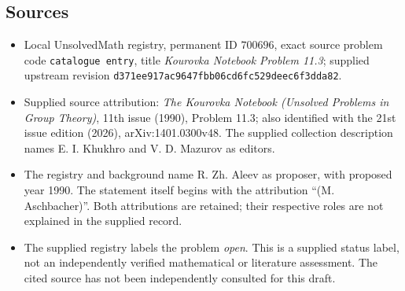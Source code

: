 \documentclass[11pt]{article}
\begin{document}
\subsection{Sources}
\begin{itemize}
\item Local UnsolvedMath registry, permanent ID \(700696\), exact source problem code \texttt{catalogue entry}, title \emph{Kourovka Notebook Problem 11.3}; supplied upstream revision \texttt{d371ee917ac9647fbb06cd6fc529deec6f3dda82}.
\item Supplied source attribution: \emph{The Kourovka Notebook (Unsolved Problems in Group Theory)}, 11th issue (1990), Problem 11.3; also identified with the 21st issue edition (2026), arXiv:1401.0300v48. The supplied collection description names E. I. Khukhro and V. D. Mazurov as editors.
\item The registry and background name R. Zh. Aleev as proposer, with proposed year 1990. The statement itself begins with the attribution ``(M. Aschbacher)''. Both attributions are retained; their respective roles are not explained in the supplied record.
\item The supplied registry labels the problem \emph{open}. This is a supplied status label, not an independently verified mathematical or literature assessment. The cited source has not been independently consulted for this draft.
\end{itemize}
\end{document}
